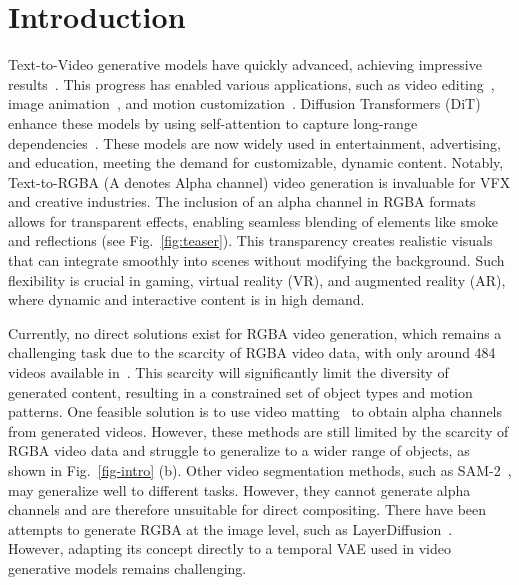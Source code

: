 \section{Introduction}
\label{sec:intro}
Text-to-Video generative models have quickly advanced, achieving impressive results~\cite{he2022latent, chen2023videocrafter1, guo2023animatediff, wang2023modelscope, wang2024videocomposer, zhang2023show, yang2024cogvideox, opensora, opensoraplan}. This progress has enabled various applications, such as video editing~\cite{geyer2023tokenflow, yang2023rerender, qi2023fatezero, liu2024video, wu2023tune, chen2023control}, image animation~\cite{blattmann2023stable, niu2024mofa, guo2024liveportrait, guo2023i2v}, and motion customization~\cite{he2024cameractrl, wang2024motionctrl, ling2024motionclone, jeong2024dreammotion, ma2023trailblazer, yin2023dragnuwa, wang2024motion}. Diffusion Transformers (DiT) enhance these models by using self-attention to capture long-range dependencies~\cite{sora2024, opensora, opensoraplan, yang2024cogvideox}. These models are now widely used in entertainment, advertising, and education, meeting the demand for customizable, dynamic content. 
Notably, Text-to-RGBA (A denotes Alpha channel) video generation is invaluable for VFX and creative industries. The inclusion of an alpha channel in RGBA formats allows for transparent effects, enabling seamless blending of elements like smoke and reflections (see Fig.~\ref{fig:teaser}). This transparency creates realistic visuals that can integrate smoothly into scenes without modifying the background. Such flexibility is crucial in gaming, virtual reality (VR), and augmented reality (AR), where dynamic and interactive content is in high demand.


Currently, no direct solutions exist for RGBA video generation, which remains a challenging task due to the scarcity of RGBA video data, with only around 484 videos available in~\cite{lin2021real}. This scarcity will significantly limit the diversity of generated content, resulting in a constrained set of object types and motion patterns.
One feasible solution is to use video matting~\cite{qin2023bimatting,lin2022robust,lin2023omnimatterf} to obtain alpha channels from generated videos. However, these methods are still limited by the scarcity of RGBA video data and struggle to generalize to a wider range of objects, as shown in Fig.~\ref{fig-intro} (b).
Other video segmentation methods, such as SAM-2~\cite{ravi2024sam2}, may generalize well to different tasks. However, they cannot generate alpha channels and are therefore unsuitable for direct compositing.
There have been attempts to generate RGBA at the image level, such as LayerDiffusion~\cite{zhang2024transparent}. 
However, adapting its concept directly to a temporal VAE used in video generative models remains challenging.

